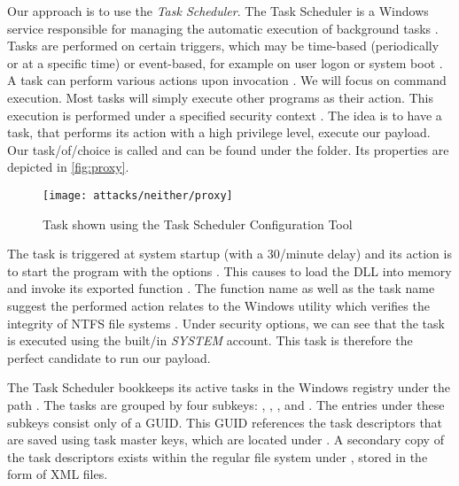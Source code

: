 Our approach is to use the \emph{Task Scheduler}.
The Task Scheduler is a Windows service responsible for managing the automatic execution of background tasks \cite[Section 10]{windows-internals-7-part2}.
Tasks are performed on certain triggers, which may be time-based (periodically or at a specific time) or event-based, for example on user logon or system boot \cite{microsoft-task-scheduler-triggers}.
A task can perform various actions upon invocation \cite{microsoft-task-scheduler-actions}.
We will focus on command execution.
Most tasks will simply execute other programs as their action.
This execution is performed under a specified security context \cite{microsoft-task-scheduler-security-contexts}.
The idea is to have a task, that performs its action with a high privilege level, execute our payload.
Our task\-/of\-/choice is called  and can be found under the  folder.
Its properties are depicted in \autoref{fig:proxy}.

\begin{figure}[htb]
    \centering
    \texttt{[image: attacks/neither/proxy]}
    \caption{ Task shown using the Task Scheduler Configuration Tool}
    \label{fig:proxy}
\end{figure}

The  task is triggered at system startup (with a 30\-/minute delay) and its action is to start the program  with the options .
This causes  to load the  \ac{DLL} into memory and invoke its exported function  \cite{microsoft-rundll32}.
The function name as well as the task name suggest the performed action relates to the Windows utility  which verifies the integrity of \ac{NTFS} file systems \cite{microsoft-autochk}.
Under security options, we can see that the task is executed using the built\-/in \emph{SYSTEM} account.
This task is therefore the perfect candidate to run our payload.

The Task Scheduler bookkeeps its active tasks in the Windows registry under the path .
The tasks are grouped by four subkeys: , , , and .
The entries under these subkeys consist only of a \ac{GUID}.
This \ac{GUID} references the task descriptors that are saved using task master keys, which are located under  \cite[Section 10]{windows-internals-7-part2}.
A secondary copy of the task descriptors exists within the regular file system under , stored in the form of \ac{XML} files.

